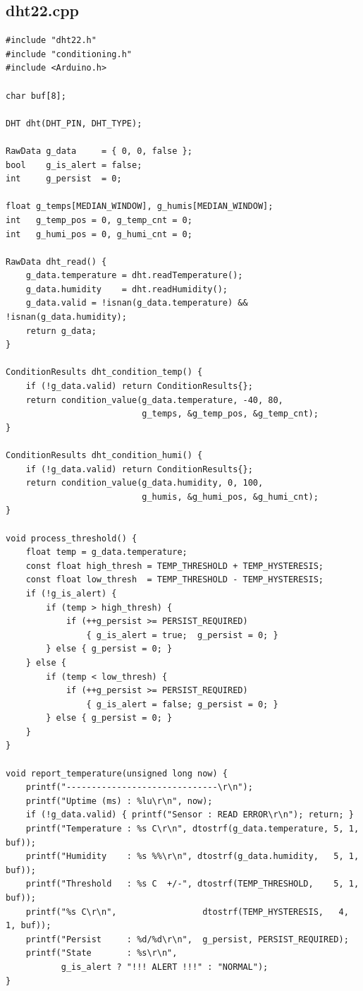 \documentclass[12pt,a4paper]{article}
\begin{document}
\subsection{dht22.cpp}
\begin{lstlisting}
#include "dht22.h"
#include "conditioning.h"
#include <Arduino.h>

char buf[8];

DHT dht(DHT_PIN, DHT_TYPE);

RawData g_data     = { 0, 0, false };
bool    g_is_alert = false;
int     g_persist  = 0;

float g_temps[MEDIAN_WINDOW], g_humis[MEDIAN_WINDOW];
int   g_temp_pos = 0, g_temp_cnt = 0;
int   g_humi_pos = 0, g_humi_cnt = 0;

RawData dht_read() {
    g_data.temperature = dht.readTemperature();
    g_data.humidity    = dht.readHumidity();
    g_data.valid = !isnan(g_data.temperature) && !isnan(g_data.humidity);
    return g_data;
}

ConditionResults dht_condition_temp() {
    if (!g_data.valid) return ConditionResults{};
    return condition_value(g_data.temperature, -40, 80,
                           g_temps, &g_temp_pos, &g_temp_cnt);
}

ConditionResults dht_condition_humi() {
    if (!g_data.valid) return ConditionResults{};
    return condition_value(g_data.humidity, 0, 100,
                           g_humis, &g_humi_pos, &g_humi_cnt);
}

void process_threshold() {
    float temp = g_data.temperature;
    const float high_thresh = TEMP_THRESHOLD + TEMP_HYSTERESIS;
    const float low_thresh  = TEMP_THRESHOLD - TEMP_HYSTERESIS;
    if (!g_is_alert) {
        if (temp > high_thresh) {
            if (++g_persist >= PERSIST_REQUIRED)
                { g_is_alert = true;  g_persist = 0; }
        } else { g_persist = 0; }
    } else {
        if (temp < low_thresh) {
            if (++g_persist >= PERSIST_REQUIRED)
                { g_is_alert = false; g_persist = 0; }
        } else { g_persist = 0; }
    }
}

void report_temperature(unsigned long now) {
    printf("------------------------------\r\n");
    printf("Uptime (ms) : %lu\r\n", now);
    if (!g_data.valid) { printf("Sensor : READ ERROR\r\n"); return; }
    printf("Temperature : %s C\r\n", dtostrf(g_data.temperature, 5, 1, buf));
    printf("Humidity    : %s %%\r\n", dtostrf(g_data.humidity,   5, 1, buf));
    printf("Threshold   : %s C  +/-", dtostrf(TEMP_THRESHOLD,    5, 1, buf));
    printf("%s C\r\n",                 dtostrf(TEMP_HYSTERESIS,   4, 1, buf));
    printf("Persist     : %d/%d\r\n",  g_persist, PERSIST_REQUIRED);
    printf("State       : %s\r\n",
           g_is_alert ? "!!! ALERT !!!" : "NORMAL");
}
\end{lstlisting}
\end{document}
